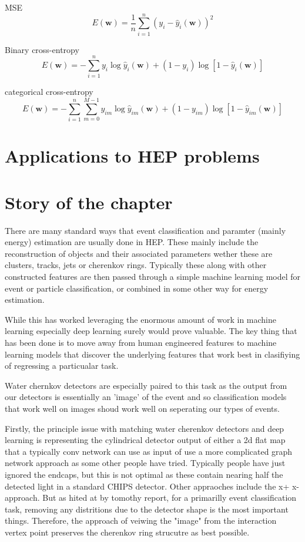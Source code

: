 MSE
\begin{equation}
    E(\boldsymbol{w})=\frac{1}{n}\displaystyle\sum_{i=1}^{n}(y_{i}-\hat{y}_{i}(\boldsymbol{w}))^{2}
\end{equation}

Binary cross-entropy
\begin{equation}
    E(\boldsymbol{w})=-\displaystyle\sum_{i=1}^{n}y_{i}\log\hat{y}_{i}(\boldsymbol{w})+(1-y_{i})\log[1-\hat{y}_{i}(\boldsymbol{w})]
\end{equation}

categorical cross-entropy
\begin{equation}
    E(\boldsymbol{w})=-\displaystyle\sum_{i=1}^{n}\displaystyle\sum_{m=0}^{M-1}y_{im}\log\hat{y}_{im}(\boldsymbol{w})+(1-y_{im})\log[1-\hat{y}_{im}(\boldsymbol{w})]
\end{equation}


\section{Applications to HEP problems}

\section{Story of the chapter}

There are many standard ways that event classification and paramter (mainly energy) estimation are
usually done in HEP. These mainly include the reconstruction of objects and their associated parameters
wether these are clusters, tracks, jets or cherenkov rings. Typically these along with other constructed
features are then passed through a simple machine learning model for event or particle classification, or
combined in some other way for energy estimation.

While this has worked leveraging the enormous amount of work in machine learning especially deep learning
surely would prove valuable. The key thing that has been done is to move away from human engineered features
to machine learning models that discover the underlying features that work best in clasifiying of regressing
a particualar task.

Water chernkov detectors are especially paired to this task as the output from our detectors is essentially
an 'image' of the event and so classification models that work well on images shoud work well on
seperating our types of events.

Firstly, the principle issue with matching water cherenkov detectors and deep learning is representing the cylindrical
detector output of either a 2d flat map that a typically conv network can use as input of use a more complicated
graph network approach as some other people have tried. Typically people have just ignored the endcaps, but
this is not optimal as these contain nearing half the detected light in a standard CHIPS detector. Other appraoches
include the x+ x- approach. But as hited at by tomothy report, for a primarilly event classification task,
removing any distritions due to the detector shape is the most important things. Therefore, the approach of
veiwing the "image" from the interaction vertex point preserves the cherenkov ring strucutre as best possible.

